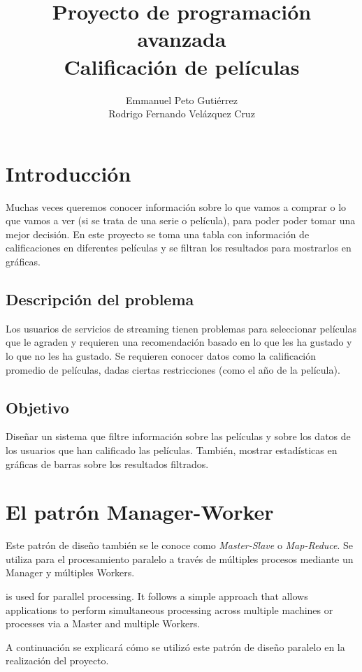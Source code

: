 \documentclass{article}
\title{Proyecto de programación avanzada\\Calificación de películas}
\author{Emmanuel Peto Gutiérrez\\Rodrigo Fernando Velázquez Cruz}
\begin{document}
\maketitle

\section{Introducción}

Muchas veces queremos conocer información sobre lo que vamos a comprar o lo que vamos a ver (si se trata de una serie o película), para poder poder tomar una mejor decisión. En este proyecto se toma una tabla con información de calificaciones en diferentes películas y se filtran los resultados para mostrarlos en gráficas.

\subsection{Descripción del problema}

Los usuarios de servicios de streaming tienen problemas para seleccionar películas que le agraden y requieren una recomendación basado en lo que les ha gustado y lo que no les ha gustado. Se requieren conocer datos como la calificación promedio de películas, dadas ciertas restricciones (como el año de la película).

\subsection{Objetivo}

Diseñar un sistema que filtre información sobre las películas y sobre los datos de los usuarios que han calificado las películas. También, mostrar estadísticas en gráficas de barras sobre los resultados filtrados.

\section{El patrón Manager-Worker}

Este patrón de diseño también se le conoce como \textit{Master-Slave} o \textit{Map-Reduce}. Se utiliza para el procesamiento paralelo a través de múltiples procesos mediante un Manager y múltiples Workers.

is used for parallel processing. It follows a simple approach that allows applications to perform simultaneous processing across multiple machines or processes via a Master and multiple Workers.

A continuación se explicará cómo se utilizó este patrón de diseño paralelo en la realización del proyecto.
\end{document}
